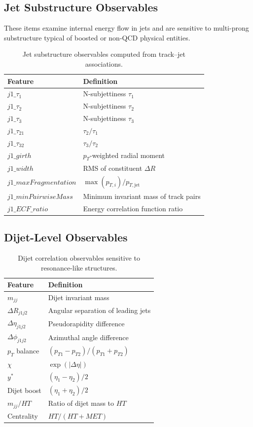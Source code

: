 \documentclass[11pt,a4paper,twocolumn]{article}
\begin{document}
\subsection{Jet Substructure Observables}
These items examine internal energy flow in jets and are sensitive to multi-prong substructure typical of boosted or non-QCD physical entities.
\begin{table}[h]
\centering
\caption{Jet substructure observables computed from track--jet associations.}
\footnotesize

\begin{tabular}{ll}
\toprule
Feature & Definition \\
\midrule
$j1\_\tau_1$ & N-subjettiness $\tau_1$ \\
$j1\_\tau_2$ & N-subjettiness $\tau_2$ \\
$j1\_\tau_3$ & N-subjettiness $\tau_3$ \\
$j1\_\tau_{21}$ & $\tau_2 / \tau_1$ \\
$j1\_\tau_{32}$ & $\tau_3 / \tau_2$ \\
$j1\_girth$ & $p_T$-weighted radial moment \\
$j1\_width$ & RMS of constituent $\Delta R$ \\
$j1\_maxFragmentation$ & $\max(p_{T,i}) / p_{T,\text{jet}}$ \\
$j1\_minPairwiseMass$ & Minimum invariant mass of track pairs \\
$j1\_ECF\_ratio$ & Energy correlation function ratio \\
\bottomrule
\end{tabular}

\end{table}

\subsection{Dijet-Level Observables}

\begin{table}[H]
\centering
\caption{Dijet correlation observables sensitive to resonance-like structures.}
\footnotesize

\begin{tabular}{ll}
\toprule
Feature & Definition \\
\midrule
$m_{jj}$ & Dijet invariant mass \\
$\Delta R_{j1j2}$ & Angular separation of leading jets \\
$\Delta \eta_{j1j2}$ & Pseudorapidity difference \\
$\Delta \phi_{j1j2}$ & Azimuthal angle difference \\
$p_T$ balance & $(p_{T1}-p_{T2})/(p_{T1}+p_{T2})$ \\
$\chi$ & $\exp(|\Delta \eta|)$ \\
$y^\ast$ & $(\eta_1 - \eta_2)/2$ \\
Dijet boost & $(\eta_1 + \eta_2)/2$ \\
$m_{jj}/HT$ & Ratio of dijet mass to $HT$ \\
Centrality & $HT/(HT + MET)$ \\
\bottomrule
\end{tabular}

\end{table}
\end{document}
